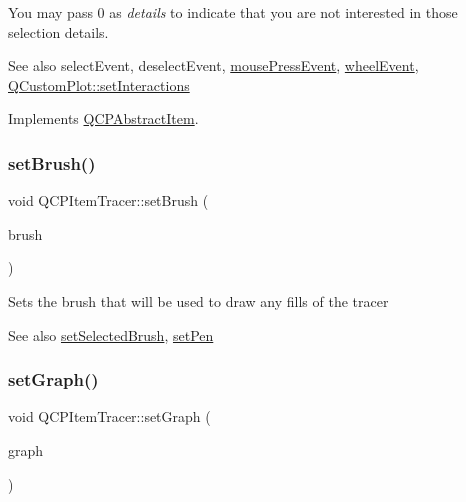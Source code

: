 You may pass 0 as {\itshape details} to indicate that you are not interested in those selection details.

\begin{DoxySeeAlso}{See also}
select\+Event, deselect\+Event, \mbox{\hyperlink{class_q_c_p_layerable_af6567604818db90f4fd52822f8bc8376}{mouse\+Press\+Event}}, \mbox{\hyperlink{class_q_c_p_layerable_a47dfd7b8fd99c08ca54e09c362b6f022}{wheel\+Event}}, \mbox{\hyperlink{class_q_custom_plot_a5ee1e2f6ae27419deca53e75907c27e5}{Q\+Custom\+Plot\+::set\+Interactions}} 
\end{DoxySeeAlso}


Implements \mbox{\hyperlink{class_q_c_p_abstract_item_ae41d0349d68bb802c49104afd100ba2a}{Q\+C\+P\+Abstract\+Item}}.

\mbox{\label{class_q_c_p_item_tracer_a2c303f7470a30084daa201ed556b3c36}} 
\subsubsection{\texorpdfstring{set\+Brush()}{setBrush()}}
{\footnotesize\ttfamily void Q\+C\+P\+Item\+Tracer\+::set\+Brush (\begin{DoxyParamCaption}\item[{const Q\+Brush \&}]{brush }\end{DoxyParamCaption})}

Sets the brush that will be used to draw any fills of the tracer

\begin{DoxySeeAlso}{See also}
\mbox{\hyperlink{class_q_c_p_item_tracer_a0f55c084980a7a312af859d3e7b558ef}{set\+Selected\+Brush}}, \mbox{\hyperlink{class_q_c_p_item_tracer_af8048636fc1ef0152e51809b008df2ca}{set\+Pen}} 
\end{DoxySeeAlso}
\mbox{\label{class_q_c_p_item_tracer_af5886f4ded8dd68cb4f3388f390790c0}} 
\subsubsection{\texorpdfstring{set\+Graph()}{setGraph()}}
{\footnotesize\ttfamily void Q\+C\+P\+Item\+Tracer\+::set\+Graph (\begin{DoxyParamCaption}\item[{\mbox{\hyperlink{class_q_c_p_graph}{Q\+C\+P\+Graph}} $\ast$}]{graph }\end{DoxyParamCaption})}

